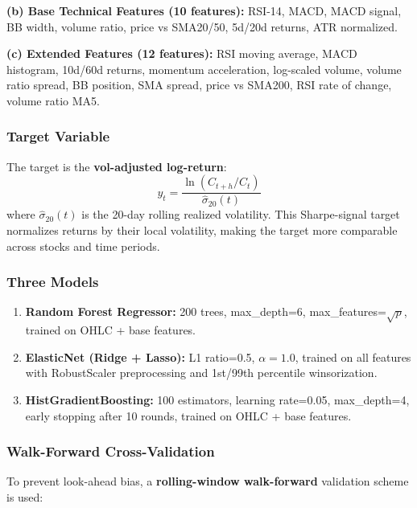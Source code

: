 \documentclass[12pt, a4paper, oneside]{report}
\begin{document}
\textbf{(b) Base Technical Features (10 features):} RSI-14, MACD, MACD signal, BB width, volume ratio, price vs SMA20/50, 5d/20d returns, ATR normalized.

\textbf{(c) Extended Features (12 features):} RSI moving average, MACD histogram, 10d/60d returns, momentum acceleration, log-scaled volume, volume ratio spread, BB position, SMA spread, price vs SMA200, RSI rate of change, volume ratio MA5.

\subsubsection{Target Variable}

The target is the \textbf{vol-adjusted log-return}:
\begin{equation}
    y_t = \frac{\ln(C_{t+h} / C_t)}{\hat{\sigma}_{20}(t)}
\end{equation}
where $\hat{\sigma}_{20}(t)$ is the 20-day rolling realized volatility. This Sharpe-signal target normalizes returns by their local volatility, making the target more comparable across stocks and time periods.

\subsubsection{Three Models}

\begin{enumerate}[nosep]
    \item \textbf{Random Forest Regressor:} 200 trees, max\_depth=6, max\_features=$\sqrt{p}$, trained on OHLC + base features.
    \item \textbf{ElasticNet (Ridge + Lasso):} L1 ratio=0.5, $\alpha=1.0$, trained on all features with RobustScaler preprocessing and 1st/99th percentile winsorization.
    \item \textbf{HistGradientBoosting:} 100 estimators, learning rate=0.05, max\_depth=4, early stopping after 10 rounds, trained on OHLC + base features.
\end{enumerate}

\subsubsection{Walk-Forward Cross-Validation}

To prevent look-ahead bias, a \textbf{rolling-window walk-forward} validation scheme is used:
\end{document}
